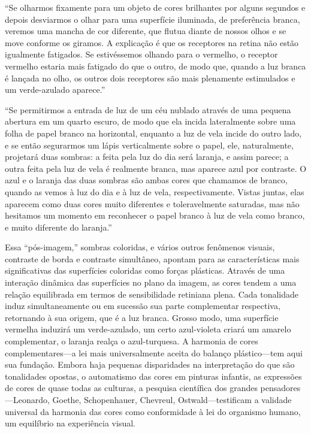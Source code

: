 \documentclass[a4paper]{article}
\begin{document}
``Se olharmos fixamente para um objeto de cores brilhantes por alguns segundos e depois desviarmos o olhar para uma superfície iluminada, de preferência branca, veremos uma mancha de cor diferente, que flutua diante de nossos olhos e se move conforme os giramos. A explicação é que os receptores na retina não estão igualmente fatigados. Se estivéssemos olhando para o vermelho, o receptor vermelho estaria mais fatigado do que o outro, de modo que, quando a luz branca é lançada no olho, os outros dois receptores são mais plenamente estimulados e um verde-azulado aparece.''

``Se permitirmos a entrada de luz de um céu nublado através de uma pequena abertura em um quarto escuro, de modo que ela incida lateralmente sobre uma folha de papel branco na horizontal, enquanto a luz de vela incide do outro lado, e se então segurarmos um lápis verticalmente sobre o papel, ele, naturalmente, projetará duas sombras: a feita pela luz do dia será laranja, e assim parece; a outra feita pela luz de vela é realmente branca, mas aparece azul por contraste. O azul e o laranja das duas sombras são ambas cores que chamamos de branco, quando as vemos à luz do dia e à luz de vela, respectivamente. Vistas juntas, elas aparecem como duas cores muito diferentes e toleravelmente saturadas, mas não hesitamos um momento em reconhecer o papel branco à luz de vela como branco, e muito diferente do laranja.''

Essa ``pós-imagem,'' sombras coloridas, e vários outros fenômenos visuais, contraste de borda e contraste simultâneo, apontam para as características mais significativas das superfícies coloridas como forças plásticas. Através de uma interação dinâmica das superfícies no plano da imagem, as cores tendem a uma relação equilibrada em termos de sensibilidade retiniana plena. Cada tonalidade induz simultaneamente ou em sucessão sua parte complementar respectiva, retornando à sua origem, que é a luz branca. Grosso modo, uma superfície vermelha induzirá um verde-azulado, um certo azul-violeta criará um amarelo complementar, o laranja realça o azul-turquesa. A harmonia de cores complementares---a lei mais universalmente aceita do balanço plástico---tem aqui sua fundação. Embora haja pequenas disparidades na interpretação do que são tonalidades opostas, o automatismo das cores em pinturas infantis, as expressões de cores de quase todas as culturas, a pesquisa científica dos grandes pensadores---Leonardo, Goethe, Schopenhauer, Chevreul, Ostwald---testificam a validade universal da harmonia das cores como conformidade à lei do organismo humano, um equilíbrio na experiência visual.
\end{document}

